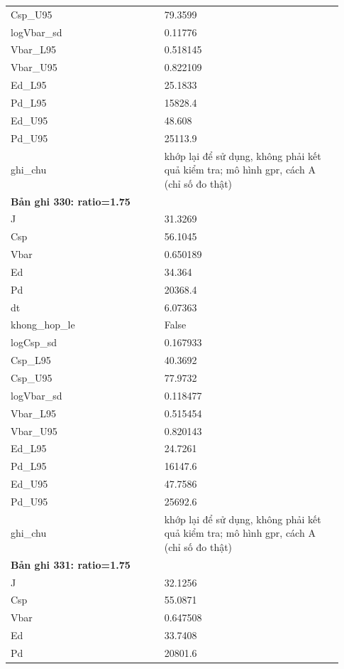 \begin{longtable}{p{0.43\linewidth}p{0.50\linewidth}}
Csp\_\allowbreak U95 & 79.3599 \\
logVbar\_\allowbreak sd & 0.11776 \\
Vbar\_\allowbreak L95 & 0.518145 \\
Vbar\_\allowbreak U95 & 0.822109 \\
Ed\_\allowbreak L95 & 25.1833 \\
Pd\_\allowbreak L95 & 15828.4 \\
Ed\_\allowbreak U95 & 48.608 \\
Pd\_\allowbreak U95 & 25113.9 \\
ghi\_\allowbreak chu & khớp lại để sử dụng, không phải kết quả kiểm tra; mô hình gpr, cách A (chỉ số đo thật) \\
\midrule
\multicolumn{2}{p{0.95\linewidth}}{\textbf{Bản ghi 330: ratio=1.75}} \\
J & 31.3269 \\
Csp & 56.1045 \\
Vbar & 0.650189 \\
Ed & 34.364 \\
Pd & 20368.4 \\
dt & 6.07363 \\
khong\_\allowbreak hop\_\allowbreak le & False \\
logCsp\_\allowbreak sd & 0.167933 \\
Csp\_\allowbreak L95 & 40.3692 \\
Csp\_\allowbreak U95 & 77.9732 \\
logVbar\_\allowbreak sd & 0.118477 \\
Vbar\_\allowbreak L95 & 0.515454 \\
Vbar\_\allowbreak U95 & 0.820143 \\
Ed\_\allowbreak L95 & 24.7261 \\
Pd\_\allowbreak L95 & 16147.6 \\
Ed\_\allowbreak U95 & 47.7586 \\
Pd\_\allowbreak U95 & 25692.6 \\
ghi\_\allowbreak chu & khớp lại để sử dụng, không phải kết quả kiểm tra; mô hình gpr, cách A (chỉ số đo thật) \\
\midrule
\multicolumn{2}{p{0.95\linewidth}}{\textbf{Bản ghi 331: ratio=1.75}} \\
J & 32.1256 \\
Csp & 55.0871 \\
Vbar & 0.647508 \\
Ed & 33.7408 \\
Pd & 20801.6 \\

\end{longtable}
